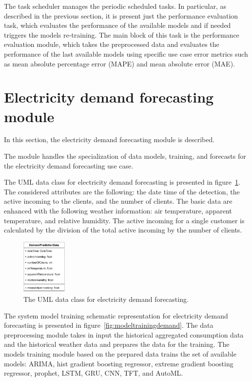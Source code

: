 The task scheduler manages the periodic scheduled tasks.
In particular, as described in the previous section, it is present just the performance evaluation task, which evaluates the performance of the available models and if needed triggers the models re-training.
The main block of this task is the performance evaluation module, which takes the preprocessed data and evaluates the performance of the last available models using specific use case error metrics such as mean absolute percentage error (MAPE) and mean absolute error (MAE).


\section{Electricity demand forecasting module}
\label{sec:demandmodel}
\vspace{0.2 cm}

In this section, the electricity demand forecasting module is described.

The module handles the specialization of data models, training, and forecasts for the electricity demand forecasting use case.

The UML data class for electricity demand forecasting is presented in figure~\ref{fig:umldemand}.
The considered attributes are the following: the date time of the detection, the active incoming to the clients, and the number of clients.
The basic data are enhanced with the following weather information: air temperature, apparent temperature, and relative humidity.
The active incoming for a single customer is calculated by the division of the total active incoming by the number of clients.

\begin{figure}[H]
\centering
\includegraphics[width=0.20\textwidth]{images/demand_prediction_uml}
\caption{The UML data class for electricity demand forecasting.}
\label{fig:umldemand}
\end{figure}

The system model training schematic representation for electricity demand forecasting is presented in figure~\ref{fig:modeltrainingdemand}.
The data preprocessing module takes in input the historical aggregated consumption data and the historical weather data and prepares the data for the training.
The models training module based on the prepared data trains the set of available models: ARIMA, hist gradient boosting regressor, extreme gradient boosting regressor, prophet, LSTM, GRU, CNN, TFT, and AutoML.

